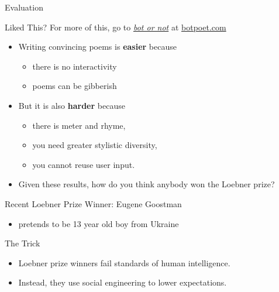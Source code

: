 \documentclass[xcolor={usenames,svgnames,x11names,dvipsnames,table}]{beamer}
\begin{document}
\begin{frame}{Evaluation}
    \begin{block}{Liked This?}
        For more of this, go to \href{botpoem.com}{\emph{bot or not}} at \url{botpoet.com}
    \end{block}

    \pause
    \begin{itemize}
        \item Writing convincing poems is \textbf{easier} because
            \begin{itemize}
                \item there is no interactivity
                \item poems can be gibberish
            \end{itemize}
        \item But it is also \textbf{harder} because
            \begin{itemize}
                \item there is meter and rhyme,
                \item you need greater stylistic diversity,
                \item you cannot reuse user input.
            \end{itemize}
        \item Given these results, how do you think anybody won the Loebner prize? 
    \end{itemize}
\end{frame}

\begin{frame}{Recent Loebner Prize Winner: Eugene Goostman}
    \begin{itemize}
        \item pretends to be 13 year old boy from Ukraine
    \end{itemize}

    \begin{block}{The Trick}
        \begin{itemize}
            \item Loebner prize winners fail standards of human intelligence.
            \item Instead, they use social engineering to lower expectations.
        \end{itemize}
    \end{block}
\end{frame}
\end{document}
